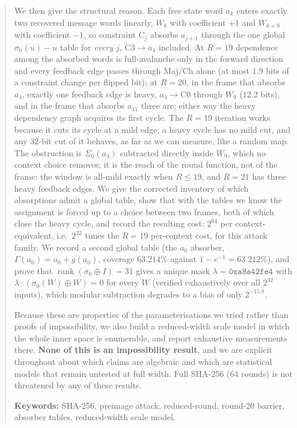 \documentclass[11pt,a4paper]{article}
\newcommand{\sig}[1]{\sigma_{#1}}
\begin{document}
\begin{abstract}
We then give the structural reason.  Each free state word $a_k$ enters
exactly two recovered message words linearly, $W_k$ with coefficient $+1$ and
$W_{k+8}$ with coefficient $-1$, so constraint C$_j$ absorbs $a_{j+1}$ through
the one global $\sigma_0(u){-}u$ table for \emph{every} $j$, C3$\to a_4$
included.  At $R{=}19$ dependence among the absorbed words is
full-avalanche only in the forward direction and every feedback edge
passes through Maj/Ch alone (at most $1.9$ bits of a constraint change per
flipped bit); at $R{=}20$, in the frame that absorbs $a_4$, exactly one
feedback edge is heavy, $a_4\to$C0 through $W_9$ ($12.2$ bits), and in the
frame that absorbs $a_{11}$ three are; either way the heavy dependency
graph acquires its first cycle.  The $R{=}19$ iteration works because it
cuts its cycle at a mild edge; a heavy cycle has no mild cut, and any
$32$-bit cut of it behaves, as far as we can measure, like a random map.  The
obstruction is $\Sigma_0(a_4)$ subtracted directly inside $W_9$, which no
context choice removes; it is the reach of the round function, not of the
frame: the window is all-mild exactly when $R\le19$, and $R{=}21$ has three
heavy feedback edges.  We give the corrected inventory of which absorptions
admit a global table, show that with the tables we know the assignment is
forced up to a choice between two frames, both of which close the heavy
cycle, and record the resulting cost: $2^{64}$ per context-equivalent,
i.e.\ $2^{32}$ times the $R{=}19$ per-context cost, for this attack
family.  We record a second global
table (the $a_0$ absorber, $\Gamma(a_0)=a_0+g(a_0)$, coverage $63.214\%$
against $1-e^{-1}=63.212\%$), and prove that
$\operatorname{rank}(\sig{0}\oplus I)=31$ gives a unique mask
$\lambda=\texttt{0xa8a42fe4}$ with $\lambda\cdot(\sig{0}(W)\oplus W)=0$ for
every $W$ (verified exhaustively over all $2^{32}$ inputs), which modular
subtraction degrades to a bias of only $2^{-15.8}$.

Because these are properties of the parameterisations we tried rather than
proofs of impossibility, we also build a reduced-width scale model in which the
whole inner space is enumerable, and report exhaustive measurements there.
\textbf{None of this is an impossibility result}, and we are explicit
throughout about which claims are algebraic and which are statistical models
that remain untested at full width.  Full SHA-256 (64 rounds) is not threatened
by any of these results.

\medskip
\noindent\textbf{Keywords:} SHA-256, preimage attack, reduced-round,
round-20 barrier, absorber tables, reduced-width scale model.
\end{abstract}
\end{document}
